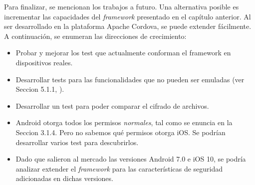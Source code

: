 Para finalizar, se mencionan los trabajos a futuro. Una alternativa posible es incrementar las capacidades del \emph{framework} presentado en el capítulo anterior. Al ser desarrollado en la plataforma Apache Cordova, se puede extender fácilmente. A continuación, se enumeran las direcciones de crecimiento:
\begin{itemize}
    \item Probar y mejorar los test que actualmente conforman el framework en dispositivos reales.
    \item Desarrollar tests para las funcionalidades que no pueden ser emuladas (ver Seccion 5.1.1, \cite{foda, foda2}).
    \item Desarrollar un test para poder comparar el cifrado de archivos.
    \item Android otorga todos los permisos \emph{normales}, tal como se enuncia en la Seccion 3.1.4. Pero no sabemos qué permisos otorga iOS. Se podrían desarrollar varios test para descubrirlos.
    \item Dado que salieron al mercado las versiones Android 7.0 e iOS 10, se podría analizar extender el \emph{framework} para las características de seguridad adicionadas en dichas versiones.
\end{itemize}